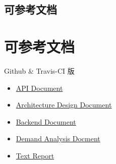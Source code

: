 \def\ApiDocPDF{\href{https://github.com/XDUDsTeam/YrarbilRelease/raw/master/APIDoc.pdf}{API Document}}
\def\ArchitectureDesignPDF{\href{https://github.com/XDUDsTeam/YrarbilRelease/raw/master/ArchitectureDesign.pdf}{Architecture Design Document}}
\def\BackEndPdf{\href{https://github.com/XDUDsTeam/YrarbilRelease/raw/master/BackEnd.pdf}{Backend Document}} 
\def\DemandAnalysisPdf{\href{https://github.com/XDUDsTeam/YrarbilRelease/raw/master/DemandAnalysis.pdf}{Demand Analysis Docment}}
\def\TestReportPDF{\href{https://github.com/XDUDsTeam/YrarbilRelease/raw/master/TestReport.pdf}{Text Report}}

\makeatletter
\ifdefined \@NoStyleChapter
\section{可参考文档}
\else
\chapter{可参考文档}
\fi
\makeatother


Github \& Travis-CI 版
\begin{itemize}
    \makeatletter
    \ifdefined \@APIDoc
    \relax
    \else
    \item \ApiDocPDF
    \fi
    
    \ifdefined \@ADDoc
    \relax
    \else
    \item \ArchitectureDesignPDF
    \fi
    
    \ifdefined \@BackendDoc
    \relax
    \else
    \item \BackEndPdf
    \fi
    
    \ifdefined \@DADoc
    \relax
    \else
    \item \DemandAnalysisPdf
    \fi
    
    \ifdefined \@TRDoc
    \relax
    \else
    \item \TestReportPDF
    \fi
    \makeatother
\end{itemize}
